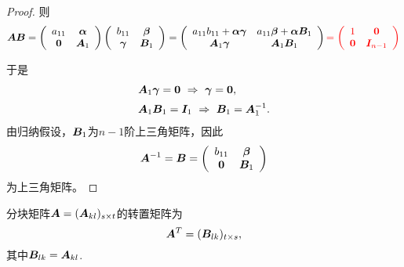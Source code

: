 \begin{proof}
则
$$
\A\B = \left(
  \begin{array}{cc}
    a_{11} & \alphabd \\
    \zero & \A_1
  \end{array}
\right)\left(
  \begin{array}{cc}
    b_{11} & \betabd \\
    \gammabd & \B_1
  \end{array}
\right) = \left(
  \begin{array}{cc}
    a_{11}b_{11}+\alphabd\gammabd & a_{11}\betabd+\alphabd \B_1\\
    \A_1\gammabd & \A_1\B_1
  \end{array}
\right)  \red{
= \left(
  \begin{array}{cc}
    1 & \zero \\
    \zero & \II_{n-1}
  \end{array}
\right)
}
  $$

  于是
  $$
  \begin{array}{l}
    \A_1 \gammabd = \zero ~ \Rightarrow ~ \gammabd=\zero, \\[0.2cm]
    \A_1\B_1 = \II_1 ~\Rightarrow~ \B_1=\A_1^{-1}.
  \end{array}
  $$
  由归纳假设，$\B_1$为$n-1$阶上三角矩阵，因此
  $$
  \A^{-1} = \B = \left(
    \begin{array}{cc}
      b_{11} & \betabd\\
      \zero & \B_1 
    \end{array}    
  \right)
  $$
  为上三角矩阵。
\end{proof}




\begin{dingyi}[分块矩阵的转置]
  分块矩阵$\A=(\A_{kl})_{s\times t}$的转置矩阵为
  $$
  \A^T = (\B_{lk})_{t\times s},
  $$
  其中$\B_{lk}=\A_{kl}$.
\end{dingyi}

